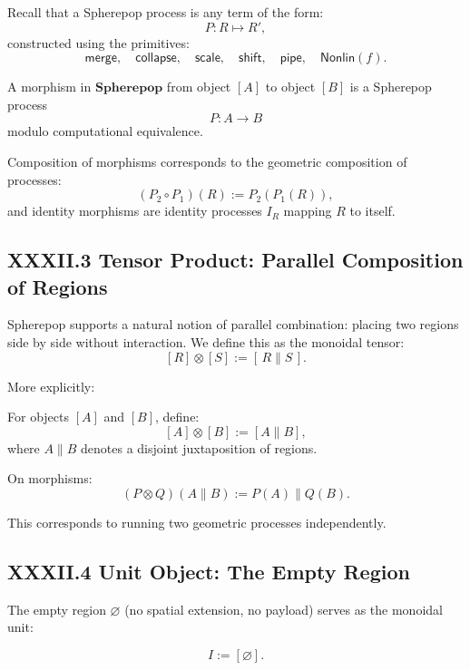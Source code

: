 \documentclass[12pt,letterpaper]{article}
\begin{document}
Recall that a Spherepop process is any term of the form:
\[
P : R \mapsto R',
\]
constructed using the primitives:
\[
\mathsf{merge},\quad \mathsf{collapse},\quad \mathsf{scale},\quad \mathsf{shift},\quad \mathsf{pipe},\quad \mathsf{Nonlin}(f).
\]

\begin{definition}[Morphisms]
A morphism in $\mathbf{Spherepop}$ from object $[A]$ to object $[B]$ is a Spherepop process 
\[
P : A \to B
\]
modulo computational equivalence.
\end{definition}

Composition of morphisms corresponds to the geometric composition of processes:
\[
(P_2 \circ P_1)(R) := P_2(P_1(R)),
\]
and identity morphisms are identity processes $I_R$ mapping $R$ to itself.

\subsection{XXXII.3 Tensor Product: Parallel Composition of Regions}

Spherepop supports a natural notion of parallel combination: placing two regions side by side without interaction. We define this as the monoidal tensor:
\[
[R] \otimes [S] := [\,R \parallel S\,].
\]

More explicitly:

\begin{definition}
For objects $[A]$ and $[B]$, define:
\[
[A] \otimes [B] := [A \parallel B],
\]
where $A \parallel B$ denotes a disjoint juxtaposition of regions.
\end{definition}

On morphisms:
\[
(P \otimes Q)(A \parallel B) := P(A) \parallel Q(B).
\]

This corresponds to running two geometric processes independently.

\subsection{XXXII.4 Unit Object: The Empty Region}

The empty region $\varnothing$ (no spatial extension, no payload) serves as the monoidal unit:

\[
I := [\varnothing].
\]
\end{document}
